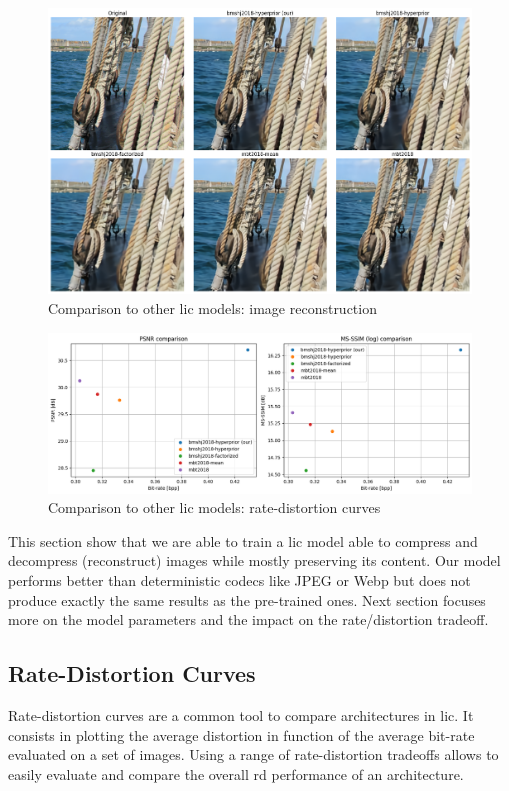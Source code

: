 \begin{figure}
    \centering
    \includegraphics[width=15cm]{img/balle_repro_4.png}
    \caption{Comparison to other \acrshort{lic} models: image reconstruction}
    \label{balle_repro_4}
\end{figure}

\begin{figure}
    \centering
    \includegraphics[width=15cm]{img/balle_repro_5.png}
    \caption{Comparison to other \acrshort{lic} models: rate-distortion curves}
    \label{balle_repro_5}
\end{figure}

This section show that we are able to train a \acrshort{lic} model able to compress and decompress (reconstruct) images while mostly preserving its content. Our model performs better than deterministic codecs like JPEG or Webp but does not produce exactly the same results as the pre-trained ones. Next section focuses more on the model parameters and the impact on the rate/distortion tradeoff.

\subsection{Rate-Distortion Curves}
Rate-distortion curves are a common tool to compare  architectures in \acrshort{lic}. It consists in plotting the average distortion in function of the average bit-rate evaluated on a set of images. Using a range of rate-distortion tradeoffs allows to easily evaluate and compare the overall \acrshort{rd} performance of an architecture.

